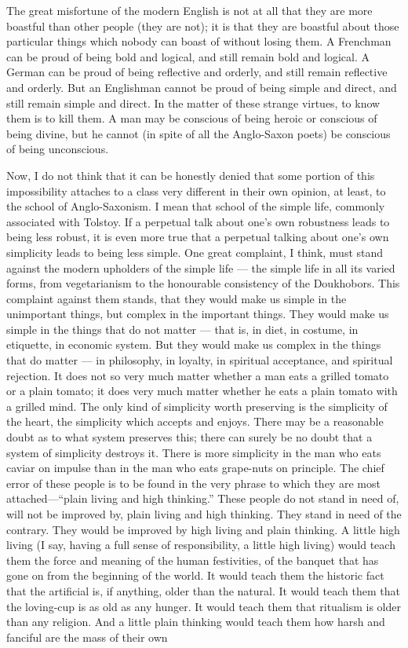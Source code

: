 
The great misfortune of the modern English is not at all that they are more boastful than other people (they are not); it is that they are boastful about those particular things which nobody can boast of without losing them. A Frenchman can be proud of being bold and logical, and still remain bold and logical. A German can be proud of being reflective and orderly, and still remain reflective and orderly. But an Englishman cannot be proud of being simple and direct, and still remain simple and direct. In the matter of these strange virtues, to know them is to kill them. A man may be conscious of being heroic or conscious of being divine, but he cannot (in spite of all the Anglo-Saxon poets) be conscious of being unconscious.

Now, I do not think that it can be honestly denied that some portion of this impossibility attaches to a class very different in their own opinion, at least, to the school of Anglo-Saxonism. I mean that school of the simple life, commonly associated with Tolstoy. If a perpetual talk about one’s own robustness leads to being less robust, it is even more true that a perpetual talking about one’s own simplicity leads to being less simple. One great complaint, I think, must stand against the modern upholders of the simple life — the simple life in all its varied forms, from vegetarianism to the honourable consistency of the Doukhobors. This complaint against them stands, that they would make us simple in the unimportant things, but complex in the important things. They would make us simple in the things that do not matter — that is, in diet, in costume, in etiquette, in economic system. But they would make us complex in the things that do matter — in philosophy, in loyalty, in spiritual acceptance, and spiritual rejection. It does not so very much matter whether a man eats a grilled tomato or a plain tomato; it does very much matter whether he eats a plain tomato with a grilled mind. The only kind of simplicity worth preserving is the simplicity of the heart, the simplicity which accepts and enjoys. There may be a reasonable doubt as to what system preserves this; there can surely be no doubt that a system of simplicity destroys it. There is more simplicity in the man who eats caviar on impulse than in the man who eats grape-nuts on principle. The chief error of these people is to be found in the very phrase to which they are most attached—“plain living and high thinking.” These people do not stand in need of, will not be improved by, plain living and high thinking. They stand in need of the contrary. They would be improved by high living and plain thinking. A little high living (I say, having a full sense of responsibility, a little high living) would teach them the force and meaning of the human festivities, of the banquet that has gone on from the beginning of the world. It would teach them the historic fact that the artificial is, if anything, older than the natural. It would teach them that the loving-cup is as old as any hunger. It would teach them that ritualism is older than any religion. And a little plain thinking would teach them how harsh and fanciful are the mass of their own 